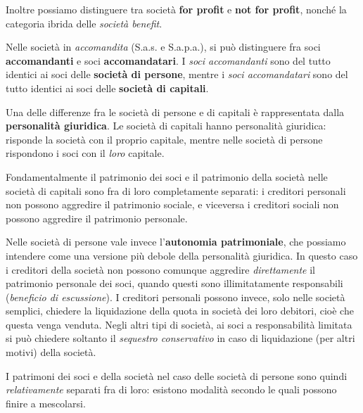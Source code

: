 \documentclass[a4paper,11pt]{article}
\begin{document}
Inoltre possiamo distinguere tra società \textbf{for profit} e \textbf{not for profit}, nonché la categoria ibrida delle \textit{società benefit}.

Nelle società in \textit{accomandita} (S.a.s. e S.a.p.a.), si può distinguere fra soci \textbf{accomandanti} e soci \textbf{accomandatari}.
I \textit{soci accomandanti} sono del tutto identici ai soci delle \textbf{società di persone}, mentre i \textit{soci accomandatari} sono del tutto identici ai soci delle \textbf{società di capitali}.

Una delle differenze fra le società di persone e di capitali è rappresentata dalla \textbf{personalità giuridica}.
Le società di capitali hanno personalità giuridica: risponde la società con il proprio capitale, mentre nelle società di persone rispondono i soci con il \textit{loro} capitale.

Fondamentalmente il patrimonio dei soci e il patrimonio della società nelle società di capitali sono fra di loro completamente separati: i creditori personali non possono aggredire il patrimonio sociale, e viceversa i creditori sociali non possono aggredire il patrimonio personale.

Nelle società di persone vale invece l'\textbf{autonomia patrimoniale}, che possiamo intendere come una versione più debole della personalità giuridica.
In questo caso i creditori della società non possono comunque aggredire \textit{direttamente} il patrimonio personale dei soci, quando questi sono illimitatamente responsabili (\textit{beneficio di escussione}).
I creditori personali possono invece, solo nelle società semplici, chiedere la liquidazione della quota in società dei loro debitori, cioè che questa venga venduta.
Negli altri tipi di società, ai soci a responsabilità limitata si può chiedere soltanto il \textit{sequestro conservativo} in caso di liquidazione (per altri motivi) della società.

I patrimoni dei soci e della società nel caso delle società di persone sono quindi \textit{relativamente} separati fra di loro: esistono modalità secondo le quali possono finire a mescolarsi.
\end{document}
